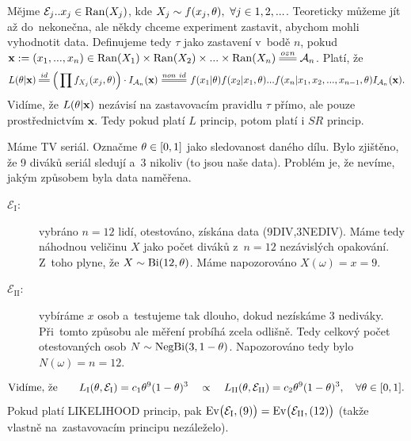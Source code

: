 \begin{example}
	Mějme $\mathcal{E}_j..x_j\in\mathop{\mathrm{Ran}}(X_j)$, kde $X_j\sim f(x_j,\theta),~\forall j\in 1,2,...$. Teoreticky můžeme jít až do~nekonečna, ale někdy chceme experiment zastavit, abychom mohli vyhodnotit data. Definujeme tedy $\tau$ jako zastavení v~bodě $n$, pokud $\textbf{x}:=(x_1,...,x_n)\in\Ran(X_1)\times\Ran(X_2)\times...\times\Ran(X_n)\equal{ozn}\Aa_n$. Platí, že
	$$ L(\t|\textbf{x})\equal{id}\Big(\prod f_{X_j}(x_j,\t) \Big)\cdot I_{\Aa_n}(\textbf{x})\equal{non~id}f(x_1|\t)f(x_2|x_1,\t)...f(x_n|x_1,x_2,...,x_{n-1},\t)I_{\Aa_n}(\textbf{x}).$$
	Vidíme, že $L(\theta|\textbf{x})$ nezávisí na zastavovacím pravidlu $\tau$ přímo, ale pouze prostřednictvím $\textbf{x}$. Tedy pokud platí $L$ princip, potom platí i $SR$ princip.
\end{example}
\begin{example}
	Máme TV seriál. Označme $\theta\in[0,1]$ jako sledovanost daného dílu. Bylo zjištěno, že 9 diváků seriál sledují a~3 nikoliv (to jsou naše data). Problém je, že nevíme, jakým způsobem byla data naměřena. 
	\begin{description}
		\item[$\mathcal{E}_\mathrm{I}:$] vybráno $n=12$ lidí, otestováno, získána data (9DIV,3NEDIV). Máme tedy náhodnou veličinu $X$ jako počet diváků z~$n=12$ nezávislých opakování. Z~toho plyne, že $X\sim \mathrm{Bi}(12,\theta)$. Máme napozorováno $X(\omega)=x=9$.
		\item[$\mathcal{E}_\mathrm{II}:$] vybíráme $x$ osob a~testujeme tak dlouho, dokud nezískáme $3$ nediváky. Při~tomto způsobu ale měření probíhá zcela odlišně. Tedy celkový počet otestovaných osob \mbox{$N\sim\mathrm{NegBi}(3,1-\theta)$}. Napozorováno tedy bylo $N(\omega)=n=12$.
	\end{description}
	$$ \text{Vidíme, že}\qquad L_\mathrm{I}(\theta,\mathcal{E}_\mathrm{I})=c_1\theta^9(1-\theta)^3\quad\propto\quad L_\mathrm{II}(\theta,\mathcal{E}_\mathrm{II})=c_2\theta^9(1-\theta)^3,\quad \forall\theta\in[0,1]. $$
	Pokud platí LIKELIHOOD princip, pak $\mathrm{Ev}\big(\mathcal{E}_\mathrm{I},(9)\big)=\mathrm{Ev}\big(\mathcal{E}_\mathrm{II},(12)\big)$ (takže vlastně na~zastavovacím principu nezáleželo).
\end{example}

